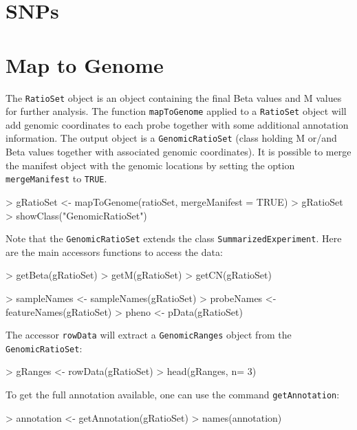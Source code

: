 \documentclass[12pt]{article}
\newcommand{\Rcode}[1]{{\texttt{#1}}}
\begin{document}
\section{SNPs}
\section{Map to Genome}
The \Rcode{RatioSet} object is an object containing the final Beta values and M values for further analysis. The function \Rcode{mapToGenome} applied to a \Rcode{RatioSet} object will add genomic coordinates to each probe together with some additional annotation information. The output object is a \Rcode{GenomicRatioSet} (class holding M or/and Beta values together with associated genomic coordinates). It is possible to merge the manifest object with the genomic locations by setting the option \Rcode{mergeManifest} to \Rcode{TRUE}.
\begin{Schunk}
\begin{Sinput}
> gRatioSet <- mapToGenome(ratioSet, mergeManifest = TRUE)
> gRatioSet
> showClass("GenomicRatioSet")
\end{Sinput}
\end{Schunk}
Note that the \texttt{GenomicRatioSet} extends the class \texttt{SummarizedExperiment}. Here are the main accessors functions to access the data:
\begin{Schunk}
\begin{Sinput}
> getBeta(gRatioSet)
> getM(gRatioSet)
> getCN(gRatioSet)
\end{Sinput}
\end{Schunk}
\begin{Schunk}
\begin{Sinput}
> sampleNames <- sampleNames(gRatioSet)
> probeNames <- featureNames(gRatioSet)
> pheno <- pData(gRatioSet)
\end{Sinput}
\end{Schunk}
The accessor \Rcode{rowData} will extract a \Rcode{GenomicRanges} object from the \Rcode{GenomicRatioSet}:
\begin{Schunk}
\begin{Sinput}
> gRanges <- rowData(gRatioSet)
> head(gRanges, n= 3)
\end{Sinput}
\end{Schunk}
To get the full annotation available, one can use the command \Rcode{getAnnotation}:
\begin{Schunk}
\begin{Sinput}
> annotation <- getAnnotation(gRatioSet)
> names(annotation)
\end{Sinput}
\end{Schunk}
\end{document}
